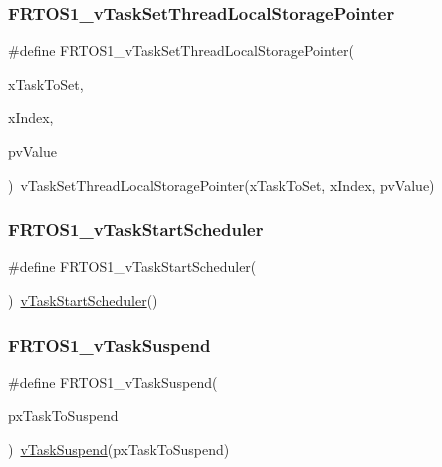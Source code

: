 \subsubsection{\texorpdfstring{F\+R\+T\+O\+S1\+\_\+v\+Task\+Set\+Thread\+Local\+Storage\+Pointer}{FRTOS1\_vTaskSetThreadLocalStoragePointer}}
{\footnotesize\ttfamily \#define F\+R\+T\+O\+S1\+\_\+v\+Task\+Set\+Thread\+Local\+Storage\+Pointer(\begin{DoxyParamCaption}\item[{}]{x\+Task\+To\+Set,  }\item[{}]{x\+Index,  }\item[{}]{pv\+Value }\end{DoxyParamCaption})~v\+Task\+Set\+Thread\+Local\+Storage\+Pointer(x\+Task\+To\+Set, x\+Index, pv\+Value)}

\mbox{\label{group___f_r_t_o_s1__module_gaf792f2c8cca61f076134b057f6029677}} 
\subsubsection{\texorpdfstring{F\+R\+T\+O\+S1\+\_\+v\+Task\+Start\+Scheduler}{FRTOS1\_vTaskStartScheduler}}
{\footnotesize\ttfamily \#define F\+R\+T\+O\+S1\+\_\+v\+Task\+Start\+Scheduler(\begin{DoxyParamCaption}{ }\end{DoxyParamCaption})~\hyperlink{tasks_8c_a598661cdd2a6af95a077245d11e3d142}{v\+Task\+Start\+Scheduler}()}

\mbox{\label{group___f_r_t_o_s1__module_ga4951eb3c0e567bbfa7fe61c2285ede9d}} 
\subsubsection{\texorpdfstring{F\+R\+T\+O\+S1\+\_\+v\+Task\+Suspend}{FRTOS1\_vTaskSuspend}}
{\footnotesize\ttfamily \#define F\+R\+T\+O\+S1\+\_\+v\+Task\+Suspend(\begin{DoxyParamCaption}\item[{}]{px\+Task\+To\+Suspend }\end{DoxyParamCaption})~\hyperlink{tasks_8c_a7fa54417f854974ae4a2b38729b60f12}{v\+Task\+Suspend}(px\+Task\+To\+Suspend)}

